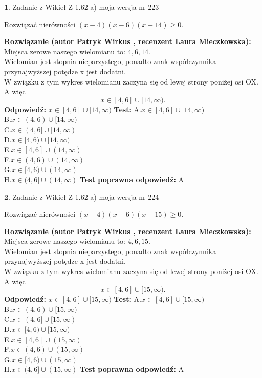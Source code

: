 \documentclass[12pt, a4paper]{article}
\theoremstyle{definition} %
\newtheorem{zad}{}
\newcommand{\zadStart}[1]{\begin{zad}#1\newline}
\newcommand{\zadStop}{\end{zad}}
\newcommand{\rozwStart}[2]{\noindent \textbf{Rozwiązanie (autor #1 , recenzent #2): }\newline}
\newcommand{\rozwStop}{\newline}
\newcommand{\odpStart}{\noindent \textbf{Odpowiedź:}\newline}
\newcommand{\odpStop}{\newline}
\newcommand{\testStart}{\noindent \textbf{Test:}\newline}
\newcommand{\testStop}{\newline}
\newcommand{\kluczStart}{\noindent \textbf{Test poprawna odpowiedź:}\newline}
\newcommand{\kluczStop}{\newline}
\begin{document}
\zadStart{Zadanie z Wikieł Z 1.62 a) moja wersja nr 223}

Rozwiązać nierówności $(x-4)(x-6)(x-14)\ge0$.
\zadStop
\rozwStart{Patryk Wirkus}{Laura Mieczkowska}
Miejsca zerowe naszego wielomianu to: $4, 6, 14$.\\
Wielomian jest stopnia nieparzystego, ponadto znak współczynnika przy\linebreak najwyższej potędze x jest dodatni.\\ W związku z tym wykres wielomianu zaczyna się od lewej strony poniżej osi OX. A więc $$x \in [4,6] \cup [14,\infty).$$
\rozwStop
\odpStart
$x \in [4,6] \cup [14,\infty)$
\odpStop
\testStart
A.$x \in [4,6] \cup [14,\infty)$\\
B.$x \in (4,6) \cup [14,\infty)$\\
C.$x \in (4,6] \cup [14,\infty)$\\
D.$x \in [4,6) \cup [14,\infty)$\\
E.$x \in [4,6] \cup (14,\infty)$\\
F.$x \in (4,6) \cup (14,\infty)$\\
G.$x \in [4,6) \cup (14,\infty)$\\
H.$x \in (4,6] \cup (14,\infty)$
\testStop
\kluczStart
A
\kluczStop



\zadStart{Zadanie z Wikieł Z 1.62 a) moja wersja nr 224}

Rozwiązać nierówności $(x-4)(x-6)(x-15)\ge0$.
\zadStop
\rozwStart{Patryk Wirkus}{Laura Mieczkowska}
Miejsca zerowe naszego wielomianu to: $4, 6, 15$.\\
Wielomian jest stopnia nieparzystego, ponadto znak współczynnika przy\linebreak najwyższej potędze x jest dodatni.\\ W związku z tym wykres wielomianu zaczyna się od lewej strony poniżej osi OX. A więc $$x \in [4,6] \cup [15,\infty).$$
\rozwStop
\odpStart
$x \in [4,6] \cup [15,\infty)$
\odpStop
\testStart
A.$x \in [4,6] \cup [15,\infty)$\\
B.$x \in (4,6) \cup [15,\infty)$\\
C.$x \in (4,6] \cup [15,\infty)$\\
D.$x \in [4,6) \cup [15,\infty)$\\
E.$x \in [4,6] \cup (15,\infty)$\\
F.$x \in (4,6) \cup (15,\infty)$\\
G.$x \in [4,6) \cup (15,\infty)$\\
H.$x \in (4,6] \cup (15,\infty)$
\testStop
\kluczStart
A
\kluczStop
\end{document}
